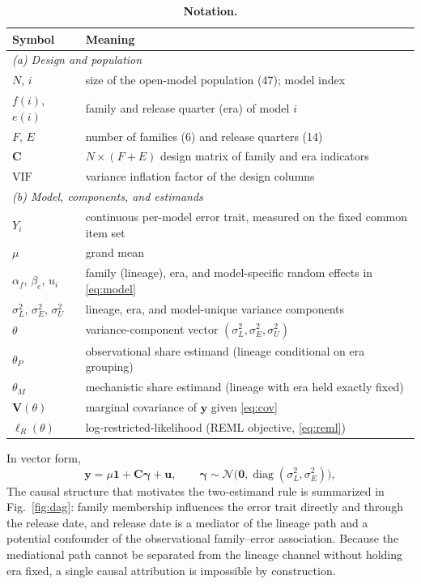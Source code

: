 \documentclass{ieeeaccess}
\theoremstyle{definition}
\theoremstyle{plain}
\begin{document}
\begin{table}[t]
\caption{\textbf{Notation.}}
\label{tab:notation}
\setlength{\tabcolsep}{3pt}
\footnotesize
\begin{tabular}{|p{44pt}|p{182pt}|}
\hline
Symbol & Meaning \\
\hline
\multicolumn{2}{|l|}{\emph{(a) Design and population}} \\
$N$, $i$ & size of the open-model population (47); model index \\
$f(i)$, $e(i)$ & family and release quarter (era) of model $i$ \\
$F$, $E$ & number of families (6) and release quarters (14) \\
$\mathbf{C}$ & $N\times(F+E)$ design matrix of family and era indicators \\
$\mathrm{VIF}$ & variance inflation factor of the design columns \\
\hline
\multicolumn{2}{|l|}{\emph{(b) Model, components, and estimands}} \\
$Y_{i}$ & continuous per-model error trait, measured on the fixed common item set \\
$\mu$ & grand mean \\
$\alpha_{f}$, $\beta_{e}$, $u_{i}$ & family (lineage), era, and model-specific random effects in \eqref{eq:model} \\
$\sigma^{2}_{L}$, $\sigma^{2}_{E}$, $\sigma^{2}_{U}$ & lineage, era, and model-unique variance components \\
$\theta$ & variance-component vector $(\sigma^{2}_{L},\sigma^{2}_{E},\sigma^{2}_{U})$ \\
$\theta_{P}$ & observational share estimand (lineage conditional on era grouping) \\
$\theta_{M}$ & mechanistic share estimand (lineage with era held exactly fixed) \\
$\mathbf{V}(\theta)$ & marginal covariance of $\mathbf{y}$ given \eqref{eq:cov} \\
$\ell_{R}(\theta)$ & log-restricted-likelihood (REML objective, \eqref{eq:reml}) \\
\hline
\end{tabular}
\end{table}

In vector form,
\begin{equation}
\mathbf{y} = \mu\mathbf{1} + \mathbf{C}\boldsymbol{\gamma} + \mathbf{u}, \qquad
\boldsymbol{\gamma}\sim\mathcal{N}\bigl(\mathbf{0},\operatorname{diag}(\sigma^{2}_{L},
\sigma^{2}_{E})\bigr),
\label{eq:vector}
\end{equation}
The causal structure that motivates the two-estimand rule is summarized in
Fig.~\ref{fig:dag}: family membership influences the error trait directly and
through the release date, and release date is a mediator of the lineage path and
a potential confounder of the observational family--error association. Because
the mediational path cannot be separated from the lineage channel without holding
era fixed, a single causal attribution is impossible by construction.
\end{document}
